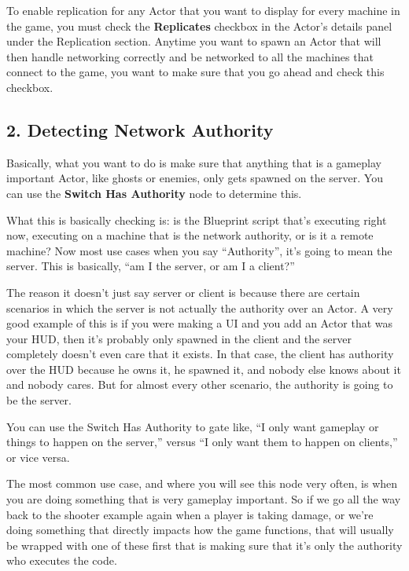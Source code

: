 \documentclass[
  letterpaper,
  DIV=11,
  numbers=noendperiod]{scrartcl}
\begin{document}
To enable replication for any Actor that you want to display for every
machine in the game, you must check the \textbf{Replicates} checkbox in
the Actor's details panel under the Replication section. Anytime you
want to spawn an Actor that will then handle networking correctly and be
networked to all the machines that connect to the game, you want to make
sure that you go ahead and check this checkbox.

\subsection{2. Detecting Network
Authority}\label{detecting-network-authority}

Basically, what you want to do is make sure that anything that is a
gameplay important Actor, like ghosts or enemies, only gets spawned on
the server. You can use the \textbf{Switch Has Authority} node to
determine this.

What this is basically checking is: is the Blueprint script that's
executing right now, executing on a machine that is the network
authority, or is it a remote machine? Now most use cases when you say
``Authority'', it's going to mean the server. This is basically, ``am I
the server, or am I a client?''

The reason it doesn't just say server or client is because there are
certain scenarios in which the server is not actually the authority over
an Actor. A very good example of this is if you were making a UI and you
add an Actor that was your HUD, then it's probably only spawned in the
client and the server completely doesn't even care that it exists. In
that case, the client has authority over the HUD because he owns it, he
spawned it, and nobody else knows about it and nobody cares. But for
almost every other scenario, the authority is going to be the server.

You can use the Switch Has Authority to gate like, ``I only want
gameplay or things to happen on the server,'' versus ``I only want them
to happen on clients,'' or vice versa.

The most common use case, and where you will see this node very often,
is when you are doing something that is very gameplay important. So if
we go all the way back to the shooter example again when a player is
taking damage, or we're doing something that directly impacts how the
game functions, that will usually be wrapped with one of these first
that is making sure that it's only the authority who executes the code.
\end{document}
